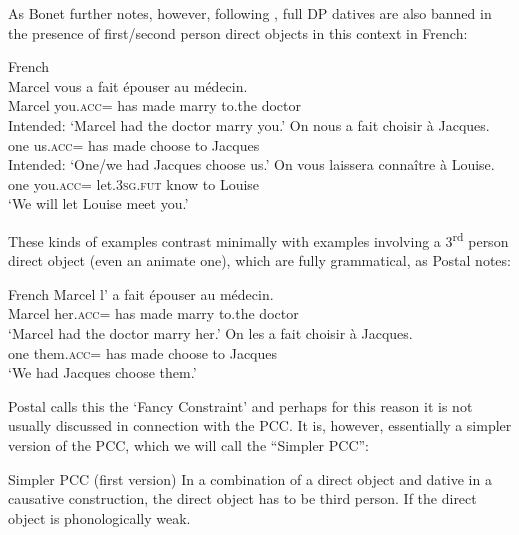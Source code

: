 \documentclass[output=paper,colorlinks,citecolor=brown,nonflat]{./langscibook}
\begin{document}
As Bonet further notes, however, following \citet{Postal1989}, full DP datives are also banned in the presence of first/second person direct objects in this context in French:

\ea%
    \label{ex:sheehan:14}
    French \citep[2]{Postal1989}\\
    \ea\label{ex:sheehan:14a}
    \gll    *Marcel vous   a   fait   épouser   au     médecin.\\
            Marcel   you.\textsc{acc}=  has   made   marry   to.the   doctor\\
    \glt    Intended: ‘Marcel had the doctor marry you.’
    \ex\label{ex:sheehan:14b}
    \gll    *On   nous     a   fait     choisir   à Jacques.\\
            one     us.\textsc{acc}= has   made   choose   to Jacques\\
    \glt    Intended: ‘One/we had Jacques choose us.’
    \ex\label{ex:sheehan:14c}
    \gll    *On   vous   laissera   connaître   à Louise.\\
            one   you\textsc{.acc}=  let.\textsc{3sg.fut} know     to Louise\\
    \glt    ‘We will let Louise meet you.'
    \z
\z

These kinds of examples contrast minimally with examples involving a 3\textsuperscript{rd} person direct object (even an animate one), which are fully grammatical, as Postal notes:

\ea%
    \label{ex:sheehan:15}
    French \citep[2]{Postal1989}
    \ea\label{ex:sheehan:15a}
    \gll  Marcel   l’       a  fait    épouser   au     médecin.\\
            Marcel   her\textsc{.acc}=  has  made    marry   to.the   doctor\\
    \glt      ‘Marcel had the doctor marry her.’
    \ex\label{ex:sheehan:15b}
    \gll    On   les       a   fait     choisir   à Jacques.\\
            one   them.\textsc{acc}=  has   made   choose   to Jacques\\
    \glt    ‘We had Jacques choose them.’
    \z
\z

Postal calls this the ‘Fancy Constraint’ and perhaps for this reason it is not usually discussed in connection with the PCC. It is, however, essentially a simpler version of the PCC, which we will call the ``Simpler PCC'':

\ea%
    \label{ex:sheehan:16}
    Simpler PCC (first version)
    \ea\label{ex:sheehan:16a}
    In a combination of a direct object and dative in a causative construction, the direct object has to be third person.
    \ex\label{ex:sheehan:16b}
    If the direct object is phonologically weak. 
    \z
\z
\end{document}
